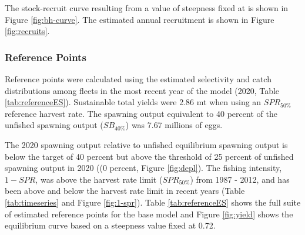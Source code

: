 \documentclass[11pt,
  english,
  a4paper,
]{article}
\begin{document}
\leavevmode\tagmcend\tagstructend\par


The stock-recruit curve resulting from a value of steepness fixed at is shown in Figure \ref{fig:bh-curve}. The estimated annual recruitment is shown in Figure \ref{fig:recruits}.

\leavevmode\tagmcend\tagstructend\par


\hypertarget{reference-points-1}{%
\subsubsection{Reference Points}\label{reference-points-1}}

\leavevmode\tagmcend\tagstructend


Reference points were calculated using the estimated selectivity and catch distributions among fleets in the most recent year of the model (2020, Table \ref{tab:referenceES}). Sustainable total yields were 2.86 mt when using an {\(SPR_{50\%}\)\leavevmode\tagmcend\tagstructend} reference harvest rate. The spawning output equivalent to 40 percent of the unfished spawning output ({\(SB_{40\%}\)\leavevmode\tagmcend\tagstructend}) was 7.67 millions of eggs.

\leavevmode\tagmcend\tagstructend\par


The 2020 spawning output relative to unfished equilibrium spawning output is below the target of 40 percent but above the threshold of 25 percent of unfished spawning output in 2020 ((0 percent, Figure \ref{fig:depl}). The fishing intensity, {\(1-SPR\)\leavevmode\tagmcend\tagstructend}, was above the harvest rate limit ({\(SPR_{50\%}\)\leavevmode\tagmcend\tagstructend}) from 1987 - 2012, and has been above and below the harvest rate limit in recent years (Table \ref{tab:timeseries} and Figure \ref{fig:1-spr}). Table \ref{tab:referenceES} shows the full suite of estimated reference points for the base model and Figure \ref{fig:yield} shows the equilibrium curve based on a steepness value fixed at 0.72.
\end{document}
